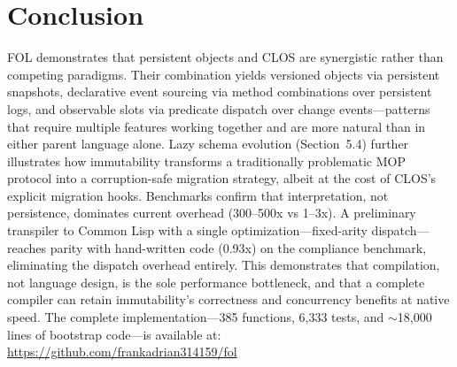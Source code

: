 \documentclass[sigconf,nonacm,review]{acmart}
\begin{document}
\section{Conclusion}

FOL demonstrates that persistent objects and CLOS are synergistic rather than competing paradigms. Their combination yields versioned objects via persistent snapshots, declarative event sourcing via method combinations
over persistent logs, and observable slots via predicate dispatch over change events---patterns that require multiple features working together and are more natural than in either parent language alone. Lazy schema
evolution (Section~5.4) further illustrates how immutability transforms a traditionally problematic MOP protocol into a corruption-safe migration strategy, albeit at the cost of CLOS's explicit migration hooks. Benchmarks
confirm that interpretation, not persistence, dominates current overhead (300--500x vs 1--3x). A preliminary transpiler to Common Lisp with a single optimization---fixed-arity dispatch---reaches parity with hand-written
code (0.93x) on the compliance benchmark, eliminating the dispatch overhead entirely. This demonstrates that compilation, not language design, is the sole performance bottleneck, and that a complete compiler can retain
immutability's correctness and concurrency benefits at native speed. The complete implementation---385 functions, 6,333 tests, and $\sim$18,000 lines of bootstrap code---is available at:
\url{https://github.com/frankadrian314159/fol}

\balance


\end{document}
